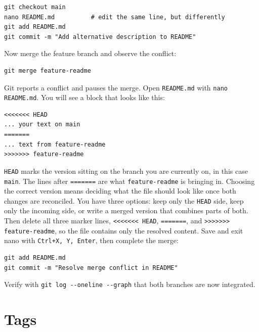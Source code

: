 \begin{verbatim}
git checkout main
nano README.md          # edit the same line, but differently
git add README.md
git commit -m "Add alternative description to README"
\end{verbatim}

 Now merge the feature branch and observe the conflict:

\begin{verbatim}
git merge feature-readme
\end{verbatim}

Git reports a conflict and pauses the merge. Open \texttt{README.md} with
\texttt{nano README.md}. You will see a block that looks like this:

\begin{verbatim}
<<<<<<< HEAD
... your text on main
=======
... text from feature-readme
>>>>>>> feature-readme
\end{verbatim}


\texttt{HEAD} marks the version sitting on the branch you are currently on,
in this case \texttt{main}. The lines after \texttt{=======} are what \texttt{feature-readme}
is bringing in. Choosing the correct version means deciding what the file should look like
once both changes are reconciled. You have three options: keep only the \texttt{HEAD} side,
keep only the incoming side, or write a merged version that combines parts of both.
Then delete all three marker lines, \texttt{<<<<<<< HEAD}, \texttt{=======},
and \texttt{>>>>>>> feature-readme}, so the file contains only the resolved content.
Save and exit nano with \texttt{Ctrl+X, Y, Enter}, then complete the merge:

\begin{verbatim}
git add README.md
git commit -m "Resolve merge conflict in README"
\end{verbatim}

Verify with \texttt{git log -{}-oneline -{}-graph} that both branches are now integrated.


\newpage
\section{Tags}

